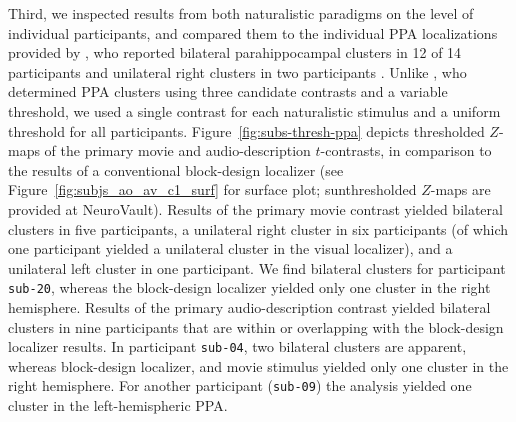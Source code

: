 \documentclass[english,11pt]{article}
\begin{document}

Third, we inspected results from both naturalistic paradigms on the level of
individual participants, and compared them to the individual PPA localizations
provided by \citet{sengupta2016extension}, who reported
bilateral parahippocampal clusters in 12 of 14 participants and unilateral right
clusters in two participants \citep[see Table~3 in][]{sengupta2016extension}.
Unlike \citet{sengupta2016extension}, who determined PPA clusters using three
candidate contrasts and a variable threshold, we used a single contrast for each
naturalistic stimulus and a uniform threshold for all participants.
Figure~\ref{fig:subs-thresh-ppa} depicts thresholded $Z$-maps of the primary
movie and audio-description $t$-contrasts, in comparison to the results of a
conventional block-design localizer (see Figure~\ref{fig:subjs_ao_av_c1_surf}
for surface plot; sunthresholded $Z$-maps are provided at
NeuroVault).
Results of the primary movie contrast yielded bilateral clusters in five
participants, a unilateral right cluster in six participants (of which one
participant yielded a unilateral cluster in the visual localizer), and a
unilateral left cluster in one participant.
We find bilateral clusters for participant \texttt{sub-20}, whereas the
block-design localizer yielded only one cluster in the right hemisphere.
Results of the primary audio-description contrast yielded bilateral clusters in
nine participants that are within or overlapping with the block-design localizer
results.
In participant \texttt{sub-04}, two bilateral clusters are apparent, whereas
block-design localizer, and movie stimulus yielded only one cluster in the right
hemisphere.
For another participant (\texttt{sub-09}) the analysis yielded one cluster in
the left-hemispheric PPA.
\end{document}
